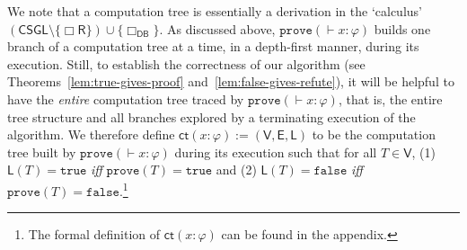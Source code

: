 \documentclass[copyright,creativecommons]{eptcs}
\newcommand{\boxr}{\Box\mathsf{R}}
\newcommand{\iffi}{\textit{iff} }
\renewcommand{\phi}{\varphi}
\newcommand{\calc}{\mathsf{CSGL}}
\newcommand{\sar}{\vdash}
\newcommand{\tseq}{T} %
\newcommand{\true}{\mathtt{true}}
\newcommand{\false}{\mathtt{false}}
\newcommand{\prove}{\mathtt{prove}}
\newcommand{\ndrule}{\Box_\mathsf{DB}}
\newcommand{\set}[1]{\{#1\}}
\newcommand{\ct}{\mathsf{ct}}
\newcommand{\ctv}{\mathsf{V}}
\newcommand{\cte}{\mathsf{E}}
\newcommand{\ctl}{\mathsf{L}}
\newcommand{\tval}{\true} %
\newcommand{\fval}{\false} %
\newcommand{\pspace}{\mathsf{PSPACE}}
\begin{document}
We note that a computation tree is essentially a derivation in the `calculus' $(\calc \setminus \set{\boxr}) \cup \set{\ndrule}$. %
As discussed above, $\prove(\sar x : \phi)$ builds one branch of a computation tree at a time, in a depth-first manner, during its execution. Still, to establish the correctness of our algorithm (see Theorems~\ref{lem:true-gives-proof} and~\ref{lem:false-gives-refute}), it will be helpful to have the \emph{entire} computation tree traced by $\prove(\sar x : \phi)$, that is, the entire tree structure and all branches explored by a terminating execution of the algorithm. We therefore define $\ct(x : \phi) := (\ctv,\cte,\ctl)$ to be the computation tree built by $\prove(\sar x : \phi)$ during its execution such that for all $\tseq \in \ctv$, (1) $\ctl(\tseq) = \tval$ \iffi $\prove(\tseq) = \true$ and (2) $\ctl(\tseq) = \fval$ \iffi $\prove(\tseq) = \false$.\footnote{The formal definition of $\ct(x : \phi)$ can be found in the appendix.} %
\end{document}
